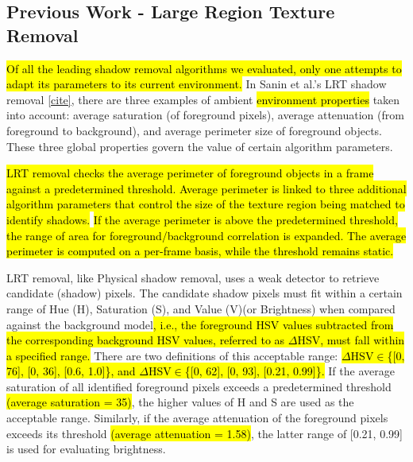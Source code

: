\documentclass[12pt]{report}
\begin{document}
\subsection{Previous Work - Large Region Texture Removal} \label{section:prevworkLRT}

\hl{Of all the leading shadow removal algorithms we evaluated, only one attempts to adapt its parameters to its current environment.} In Sanin et al.'s LRT shadow removal \underline{[cite]}, there are three examples of ambient \hl{environment properties} taken into account: average saturation (of foreground pixels), average attenuation (from foreground to background), and average perimeter size of foreground objects. These three global properties govern the value of certain algorithm parameters.

\hl{LRT removal checks the average perimeter of foreground objects in a frame against a predetermined threshold. Average perimeter is linked to three additional algorithm parameters that control the size of the texture region being matched to identify shadows.} \hl{If the average perimeter is above the predetermined threshold, the range of area for foreground/background correlation is expanded. The average perimeter is computed on a per-frame basis, while the threshold remains static.}

LRT removal, like Physical shadow removal, uses a weak detector to retrieve candidate (shadow) pixels. The candidate shadow pixels must fit within a certain range of Hue (H), Saturation (S), and Value (V)(or Brightness) when compared against the background model\hl{, i.e., the foreground HSV values subtracted from the corresponding background HSV values, referred to as $\Delta$HSV, must fall within a specified range.} There are two definitions of this acceptable range: \hl{$\Delta$HSV$\in$\{[0, 76], [0, 36], [0.6, 1.0]\}, and $\Delta$HSV$\in$\{[0, 62], [0, 93], [0.21, 0.99]\}.} If the average saturation of all identified foreground pixels exceeds a predetermined threshold \hl{(average saturation = 35)}, the higher values of H and S are used as the acceptable range. Similarly, if the average attenuation of the foreground pixels exceeds its threshold \hl{(average attenuation = 1.58)}, the latter range of [0.21, 0.99] is used for evaluating brightness. 

\end{document}
